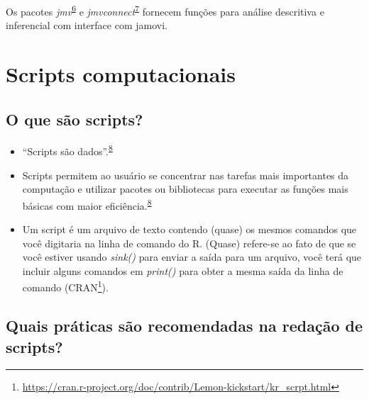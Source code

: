 \documentclass[
  a4paper,
]{book}
\renewcommand{\href}[2]{#2\footnote{\url{#1}}}
\newenvironment{infobox}[1]
  {
  \begin{itemize}
  \renewcommand{\labelitemi}{
    \raisebox{-.7\height}[0pt][0pt]{
      {\setkeys{Gin}{width=3em,keepaspectratio}
        \texttt{[image: \#1]}}
    }
  }
  \setlength{\fboxsep}{1em}
  \begin{blackbox}
  \item
  }
  {
  \end{blackbox}
  \end{itemize}
  }
\begin{document}
\begin{infobox}{images/Rlogo}
Os pacotes \emph{jmv}\textsuperscript{\protect\hyperlink{ref-jmv}{6}} e \emph{jmvconnect}\textsuperscript{\protect\hyperlink{ref-jmvconnect}{7}} fornecem funções para análise descritiva e inferencial com interface com jamovi.

\end{infobox}

\hypertarget{scripts-computacionais}{%
\section{Scripts computacionais}\label{scripts-computacionais}}

\hypertarget{o-que-suxe3o-scripts}{%
\subsection{O que são scripts?}\label{o-que-suxe3o-scripts}}

\begin{itemize}
\item
  ``Scripts são dados''.\textsuperscript{\protect\hyperlink{ref-hinsen2011}{8}}
\item
  Scripts permitem ao usuário se concentrar nas tarefas mais importantes da computação e utilizar pacotes ou bibliotecas para executar as funções mais básicas com maior eficiência.\textsuperscript{\protect\hyperlink{ref-hinsen2011}{8}}
\item
  Um script é um arquivo de texto contendo (quase) os mesmos comandos que você digitaria na linha de comando do R. (Quase) refere-se ao fato de que se você estiver usando \emph{sink()} para enviar a saída para um arquivo, você terá que incluir alguns comandos em \emph{print()} para obter a mesma saída da linha de comando (\href{https://cran.r-project.org/doc/contrib/Lemon-kickstart/kr_scrpt.html}{CRAN}).
\end{itemize}

\hypertarget{quais-pruxe1ticas-suxe3o-recomendadas-na-redauxe7uxe3o-de-scripts}{%
\subsection{Quais práticas são recomendadas na redação de scripts?}\label{quais-pruxe1ticas-suxe3o-recomendadas-na-redauxe7uxe3o-de-scripts}}
\end{document}
